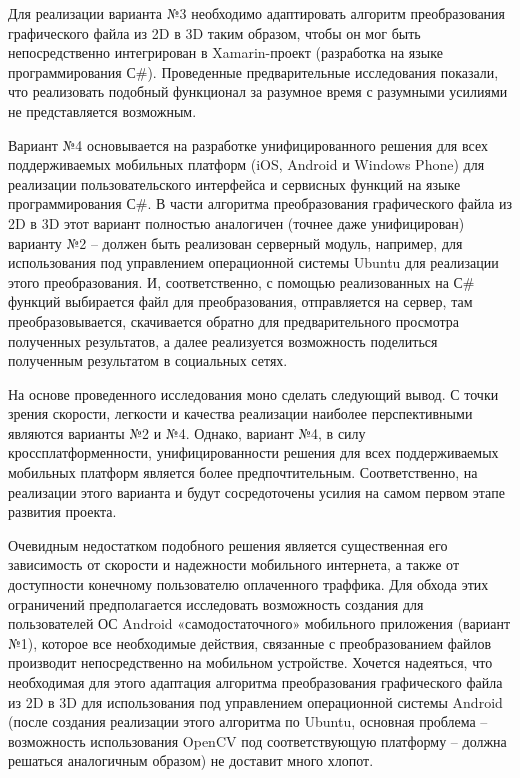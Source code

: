 Для реализации варианта №3 необходимо адаптировать алгоритм преобразования графического файла из 2D в 3D таким образом, чтобы он мог быть непосредственно интегрирован в Xamarin-проект (разработка на языке программирования С\#). Проведенные предварительные исследования показали, что реализовать подобный функционал за разумное время с разумными усилиями не представляется возможным.

Вариант №4 основывается на разработке унифицированного решения для всех поддерживаемых мобильных платформ (iOS, Android и Windows Phone) для реализации пользовательского интерфейса и сервисных функций на языке программирования С\#. В части алгоритма преобразования графического файла из 2D в 3D этот вариант полностью аналогичен (точнее даже унифицирован) варианту №2 – должен быть реализован серверный модуль, например, для использования под управлением операционной системы Ubuntu для реализации этого преобразования. И, соответственно, с помощью реализованных на С\# функций выбирается файл для преобразования, отправляется на сервер, там преобразовывается, скачивается обратно для предварительного просмотра полученных результатов, а далее реализуется возможность поделиться полученным результатом в социальных сетях.

На основе проведенного исследования моно сделать следующий вывод. С точки зрения скорости, легкости и качества реализации наиболее перспективными являются варианты №2 и №4. Однако, вариант №4, в силу кроссплатформенности, унифицированности решения для всех поддерживаемых мобильных платформ является более предпочтительным. Соответственно, на реализации этого варианта и будут сосредоточены усилия на самом первом этапе развития проекта. 

Очевидным недостатком подобного решения является существенная его зависимость от скорости и надежности мобильного интернета, а также от доступности конечному пользователю оплаченного траффика. Для обхода этих ограничений предполагается исследовать возможность создания для пользователей ОС Android «самодостаточного» мобильного приложения (вариант №1), которое все необходимые действия, связанные с преобразованием файлов производит непосредственно на мобильном устройстве. Хочется надеяться, что необходимая для этого адаптация алгоритма преобразования графического файла из 2D в 3D для использования под управлением операционной системы Android (после создания реализации этого алгоритма по Ubuntu, основная проблема – возможность использования OpenCV под соответствующую платформу – должна решаться аналогичным образом) не доставит много хлопот.

